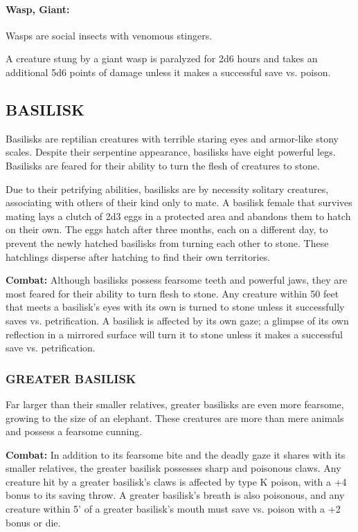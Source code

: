 \begin{multicols}{2}
\paragraph{Wasp, Giant:} Wasps are social insects with venomous stingers.

A creature stung by a giant wasp is paralyzed for 2d6 hours and takes an additional 5d6 points of damage unless it makes a successful save vs. poison.

\subsection{BASILISK}

Basilisks are reptilian creatures with terrible staring eyes and armor-like stony scales. Despite their serpentine appearance, basilisks have eight powerful legs. Basilisks are feared for their ability to turn the flesh of creatures to stone.

Due to their petrifying abilities, basilisks are by necessity solitary creatures, associating with others of their kind only to mate. A basilisk female that survives mating lays a clutch of 2d3 eggs in a protected area and abandons them to hatch on their own. The eggs hatch after three months, each on a different day, to prevent the newly hatched basilisks from turning each other to stone. These hatchlings disperse after hatching to find their own territories.

\textbf{Combat:} Although basilisks possess fearsome teeth and powerful jaws, they are most feared for their ability to turn flesh to stone. Any creature within 50 feet that meets a basilisk's eyes with its own is turned to stone unless it successfully saves vs. petrification. A basilisk is affected by its own gaze; a glimpse of its own reflection in a mirrored surface will turn it to stone unless it makes a successful save vs. petrification.

\subsubsection{GREATER BASILISK}

Far larger than their smaller relatives, greater basilisks are even more fearsome, growing to the size of an elephant. These creatures are more than mere animals and possess a fearsome cunning.

\textbf{Combat:} In addition to its fearsome bite and the deadly gaze it shares with its smaller relatives, the greater basilisk possesses sharp and poisonous claws. Any creature hit by a greater basilisk's claws is affected by type K poison, with a +4 bonus to its saving throw. A greater basilisk's breath is also poisonous, and any creature within 5' of a greater basilisk's mouth must save vs. poison with a +2 bonus or die.


\end{multicols}

